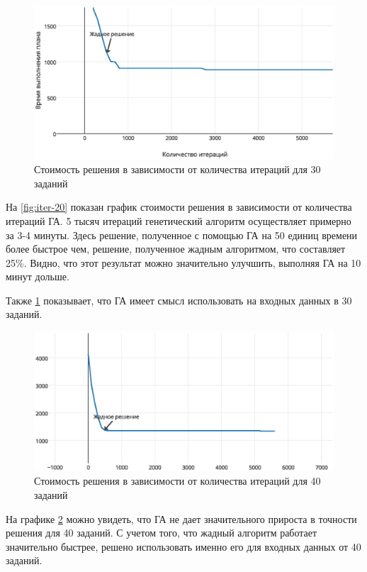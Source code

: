 \documentclass[a4paper,14pt,russian]{article}
\begin{document}
\begin{figure}[here]
\includegraphics[scale=0.8]{images/iter-value-30-plot.eps}
\caption{Стоимость решения в зависимости от количества итераций для 30 заданий}
\label{fig:iter-30}
\end{figure}
\pagebreak

На \cref{fig:iter-20} показан график стоимости решения в зависимости от количества итераций ГА. 5 тысяч итераций генетический алгоритм осуществляет примерно за 3-4 минуты. Здесь решение, полученное с помощью ГА на 50 единиц времени более быстрое чем, решение, полученное жадным алгоритмом, что составляет 25\%. Видно, что этот результат можно значительно улучшить, выполняя ГА на 10 минут дольше.

Также \cref{fig:iter-30} показывает, что ГА имеет смысл использовать на входных данных в 30 заданий.

\pagebreak
\begin{figure}[here]
\includegraphics[scale=0.8]{images/iter-value-50.eps}
\caption{Стоимость решения в зависимости от количества итераций для 40 заданий}
\label{fig:iter-40}
\end{figure}

На графике \cref{fig:iter-40} можно увидеть, что ГА не дает значительного прироста в точности решения для 40 заданий. С учетом того, что жадный алгоритм работает значительно быстрее, решено использовать именно его для входных данных от 40 заданий.
\end{document}

